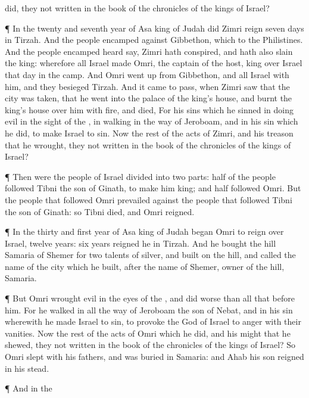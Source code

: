 {did,
{} they not
written in the
book of the
chronicles of the
kings of
Israel?
\par }{\PP {}¶ In the
twenty and
seventh
year of
Asa
king of
Judah did
Zimri
reign
seven
days in
Tirzah. And the
people
{}
encamped against
Gibbethon, which
{} to the
Philistines.
And the
people
{}
encamped
heard
say,
Zimri hath
conspired, and hath also
slain the
king: wherefore all
Israel made
Omri, the
captain of the
host,
king over
Israel that
day in the
camp.
And
Omri went
up from
Gibbethon, and all
Israel with him, and they
besieged
Tirzah.
And it came to pass, when
Zimri
saw that the
city was
taken, that he
went into the
palace of the
king’s
house, and
burnt the
king’s
house over him with
fire, and
died,
For his
sins which he
sinned in
doing
evil in the
sight of the
{}, in
walking in the
way of
Jeroboam, and in his
sin which he
did, to make
Israel to
sin.
Now the
rest of the
acts of
Zimri, and his
treason that he
wrought,
{} they not
written in the
book of the
chronicles of the
kings of
Israel?
\par }{\PP {}¶ Then were the
people of
Israel
divided into two
parts:
half of the
people
followed
Tibni the
son of
Ginath, to make him
king; and
half
followed
Omri.
But the
people that
followed
Omri
prevailed
against the
people that
followed
Tibni the
son of
Ginath: so
Tibni
died, and
Omri
reigned.
\par }{\PP {}¶ In the
thirty and
first
year of
Asa
king of
Judah began
Omri to
reign over
Israel,
twelve
years:
six
years
reigned he in
Tirzah.
And he
bought the
hill
Samaria of
Shemer for two
talents of
silver, and
built on the
hill, and
called the
name of the
city which he
built, after the
name of
Shemer,
owner of the
hill,
Samaria.
\par }{\PP {}¶ But
Omri
wrought
evil in the
eyes of the
{}, and did
worse than all that
{}
before him.
For he
walked in all the
way of
Jeroboam the
son of
Nebat, and in his
sin wherewith he made
Israel to
sin, to provoke the
{}
God of
Israel to
anger with their
vanities.
Now the
rest of the
acts of
Omri which he
did, and his
might that he
shewed,
{} they not
written in the
book of the
chronicles of the
kings of
Israel?
So
Omri
slept with his
fathers, and was
buried in
Samaria: and
Ahab his
son
reigned in his stead.
\par }{\PP {}¶ And in the
}
